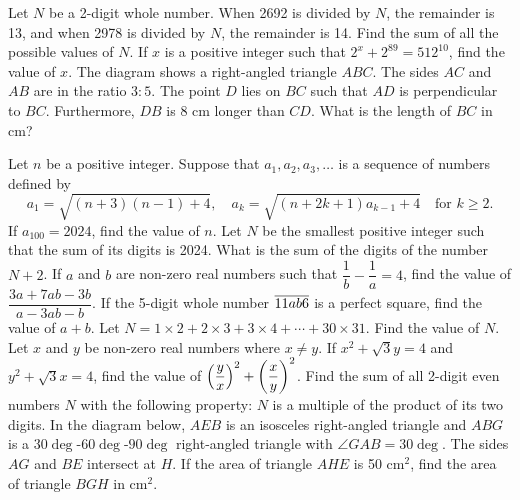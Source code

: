 \clearpage
\sq

\begin{enumerate}
    \setcounter{enumi}{5}
    \hyperrefitem[Q::2024-J-1-6] Let $N$ be a 2-digit whole number. When 2692 is divided by $N$, the remainder is 13, and when 2978 is divided by $N$, the remainder is 14. Find the sum of all the possible values of $N$.
    \hyperrefitem[Q::2024-J-1-7] If $x$ is a positive integer such that $2^x + 2^{89} = 512^{10}$, find the value of $x$.
    \hyperrefitem[Q::2024-J-1-8] The diagram shows a right-angled triangle $ABC$. The sides $AC$ and $AB$ are in the ratio $3:5$. The point $D$ lies on $BC$ such that $AD$ is perpendicular to $BC$. Furthermore, $DB$ is 8 cm longer than $CD$. What is the length of $BC$ in cm?

    \begin{center}
    \end{center}
    \hyperrefitem[Q::2024-J-1-9] Let $n$ be a positive integer. Suppose that $a_1, a_2, a_3, \ldots$ is a sequence of numbers defined by \[a_1 = \sqrt{(n+3)(n-1) + 4}, \quad a_k = \sqrt{(n + 2k + 1)a_{k-1} + 4} \quad \text{for $k \geq 2$}.\] If $a_{100} = 2024$, find the value of $n$.
    \hyperrefitem[Q::2024-J-1-10] Let $N$ be the smallest positive integer such that the sum of its digits is 2024. What is the sum of the digits of the number $N + 2$.
    \hyperrefitem[Q::2024-J-1-11] If $a$ and $b$ are non-zero real numbers such that $\dfrac1b - \dfrac1a = 4$, find the value of $\dfrac{3a + 7ab - 3b}{a - 3ab - b}$.
    \hyperrefitem[Q::2024-J-1-12] If the 5-digit whole number $\overline{11ab6}$ is a perfect square, find the value of $a + b$.
    \hyperrefitem[Q::2024-J-1-13] Let $N = 1 \times 2 + 2 \times 3 + 3 \times 4 + \cdots + 30 \times 31$. Find the value of $N$.
    \hyperrefitem[Q::2024-J-1-14] Let $x$ and $y$ be non-zero real numbers where $x \neq y$. If $x^2 + \sqrt3 y = 4$ and $y^2 + \sqrt3 x = 4$, find the value of $\left( \dfrac{y}{x} \right)^2 + \left( \dfrac{x}{y} \right)^2$.
    \hyperrefitem[Q::2024-J-1-15] Find the sum of all 2-digit even numbers $N$ with the following property: $N$ is a multiple of the product of its two digits.
    \clearpage
    \hyperrefitem[Q::2024-J-1-16] In the diagram below, $AEB$ is an isosceles right-angled triangle and $ABG$ is a $30\deg$-$60\deg$-$90\deg$ right-angled triangle with $\angle GAB = 30\deg$. The sides $AG$ and $BE$ intersect at $H$. If the area of triangle $AHE$ is 50 cm$^2$, find the area of triangle $BGH$ in cm$^2$.
    

\end{enumerate}
